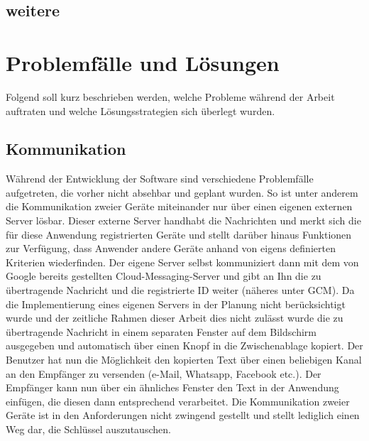 \documentclass[10pt, a4paper,headsepline]{scrreprt}
\begin{document}
\section{weitere}

\chapter{Problemfälle und Lösungen}
Folgend soll kurz beschrieben werden, welche Probleme während der Arbeit auftraten und welche Lösungsstrategien sich überlegt wurden.


\section{Kommunikation}
Während der Entwicklung der Software sind verschiedene Problemfälle aufgetreten, die vorher nicht absehbar und geplant wurden. So ist unter anderem die Kommunikation zweier Geräte miteinander nur über einen eigenen externen Server lösbar. Dieser externe Server handhabt die Nachrichten und merkt sich die für diese Anwendung registrierten Geräte und stellt darüber hinaus Funktionen zur Verfügung, dass Anwender andere Geräte anhand von eigens definierten Kriterien wiederfinden. Der eigene Server selbst kommuniziert dann mit dem von Google bereits gestellten Cloud-Messaging-Server und gibt an Ihn die zu übertragende Nachricht und die registrierte ID weiter (näheres unter GCM). Da die Implementierung eines eigenen Servers in der Planung nicht berücksichtigt wurde und der zeitliche Rahmen dieser Arbeit dies nicht zulässt wurde die zu übertragende Nachricht in einem separaten Fenster auf dem Bildschirm ausgegeben und automatisch über einen Knopf in die Zwischenablage kopiert. Der Benutzer hat nun die Möglichkeit den kopierten Text über einen beliebigen Kanal an den Empfänger zu versenden (e-Mail, Whatsapp, Facebook etc.). Der Empfänger kann nun über ein ähnliches Fenster den Text in der Anwendung einfügen, die diesen dann entsprechend verarbeitet. Die Kommunikation zweier Geräte ist in den Anforderungen nicht zwingend gestellt und stellt lediglich einen Weg dar, die Schlüssel auszutauschen. 
\end{document}
